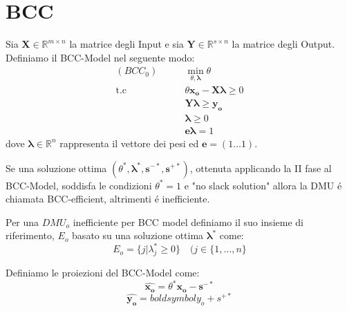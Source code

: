 \section{BCC}
\bigskip
\begin{definiz}
Sia $\boldsymbol{X} \in \mathbb{R}^{m \times n}$ la matrice degli Input e sia $\boldsymbol{Y} \in \mathbb{R}^{s \times n}$  la matrice degli Output. Definiamo il BCC-Model nel seguente modo:
\begin{equation}
\begin{split}
(BCC_0) \qquad & \min_{\theta, \boldsymbol{\lambda}} \theta \\
\text{t.c} \qquad & \theta\boldsymbol{x_o} - \boldsymbol{X\lambda} \geq 0 \\
& \boldsymbol{Y\lambda} \geq \boldsymbol{y_o} \\
& \boldsymbol{\lambda} \geq 0 \\
& \boldsymbol{e\lambda} = 1
\end{split}
\end{equation}
dove $\boldsymbol{\lambda} \in \mathbb{R}^{n}$ rappresenta il vettore dei pesi ed $\boldsymbol{e} = (1 \dots 1)$.
\end{definiz}
\begin{definiz}
Se una soluzione ottima $(\theta^{*}, \boldsymbol{\lambda^{*}, s^{-*}, s^{+*}})$, ottenuta applicando la II fase al BCC-Model, soddisfa le condizioni $\theta^{*} = 1$ e "no slack solution" allora la DMU \'e chiamata BCC-efficient, altrimenti \'e inefficiente. 
\end{definiz}
\begin{definiz}
Per una $DMU_{o}$ inefficiente per BCC model definiamo il suo insieme di riferimento, $E_{o}$ basato su una soluzione ottima $\boldsymbol{\lambda^*}$ come:
\begin{equation} \label{eq: insieme riferimento BCC}
E_{o} = \lbrace j | \lambda_{j}^* \geq 0 \rbrace \quad (j \in \lbrace 1, \dots , n \rbrace
\end{equation}
\end{definiz}
\begin{definiz}
Definiamo le proiezioni del BCC-Model come:
\begin{equation} \label{eq:projection-bcc-x}
 \hat{\boldsymbol{x_{o}}} = \theta^* \boldsymbol{x_o - s^{-*}}
\end{equation}
\begin{equation}\label{eq:projection-bcc-y}
 \hat{\boldsymbol{y_{o}}} = boldsymbol{y_o + s^{+*}}
\end{equation}
\end{definiz}
